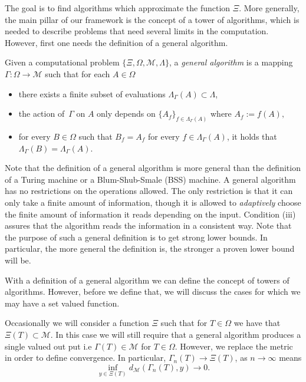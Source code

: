\documentclass[a4paper,10pt]{article}
\begin{document}
The goal is to find algorithms which approximate the function $\Xi$. More generally, the main pillar of our framework is the concept of a tower of algorithms, which is needed to describe problems that need several limits in the computation. However, first one needs the definition of a general algorithm.
\begin{definition}\label{Gen_alg}
Given a computational problem $\{\Xi,\Omega,\mathcal{M},\Lambda\}$, a \emph{general algorithm} is a mapping $\Gamma:\Omega\to \mathcal{M}$ such that for each $A\in\Omega$
\begin{itemize}
\item[(i)] there exists a finite subset of evaluations $\Lambda_\Gamma(A) \subset\Lambda$, 
\item[(ii)] the action of $\,\Gamma$ on $A$ only depends on $\{A_f\}_{f \in \Lambda_\Gamma(A)}$ where $A_f := f(A),$
\item[(iii)] for every $B\in\Omega$ such that $B_f=A_f$ for every $f\in\Lambda_\Gamma(A)$, it holds that $\Lambda_\Gamma(B)=\Lambda_\Gamma(A)$.
\end{itemize}
\end{definition}

Note that the definition of a general algorithm is more general than the definition of a Turing machine or a Blum-Shub-Smale (BSS) machine. A general algorithm has no restrictions on the operations allowed. The only restriction is that it can only take a finite amount of information, though it is allowed to \emph{adaptively} choose the finite amount of information it reads depending on the input. Condition (iii) assures that the algorithm reads the information in a consistent way. Note that the purpose of such a general definition is to get strong lower bounds. In particular, the more general the definition is, the stronger a proven lower bound will be. 


With a definition of a general algorithm we can define the concept of towers of algorithms. However, before we define that, we will discuss the cases for which we may have a set valued function. 

\begin{remark}\label{rem:set_valued}
Occasionally we will consider a function $\Xi$ such that for $T \in \Omega$ we have that $\Xi(T) \subset \mathcal{M}$. In this case we will still require that a general algorithm produces a single valued out put i.e $\Gamma(T) \in \mathcal{M}$ for $T \in \Omega$. However, we replace the metric in order to define convergence. In particular, $\Gamma_n(T) \rightarrow \Xi(T)$, as $n \rightarrow \infty$ means 
\[
\inf_{y \in \Xi(T)} d_{\mathcal{M}}(\Gamma_n(T),y) \rightarrow 0. 
\]
\end{remark}
\end{document}
